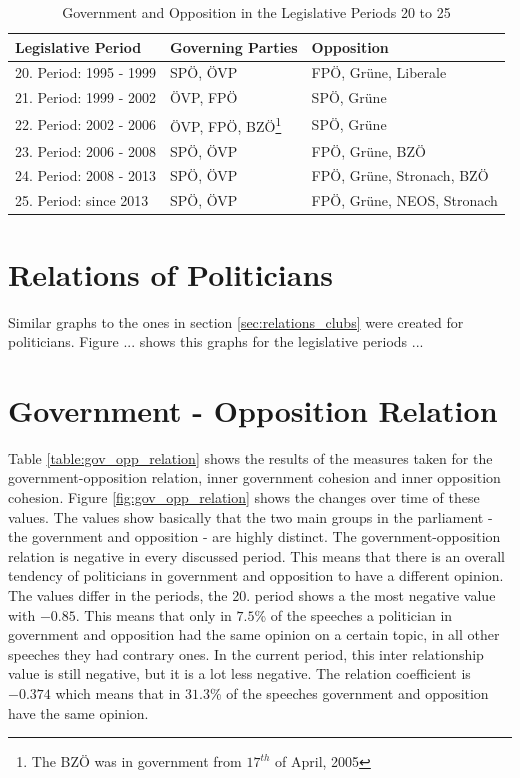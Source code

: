\begin{table}[h]

\centering
\bgroup
\def\arraystretch{1.2}
\begin{tabular}{| p{4cm} | p{3cm} | l |}
\hline
  Legislative Period & Governing Parties & Opposition  \\
\hline
\hline
  20. Period: 1995 - 1999 & SPÖ, ÖVP & FPÖ, Grüne, Liberale \\
\hline
  21. Period: 1999 - 2002 & ÖVP, FPÖ & SPÖ, Grüne \\
\hline
  22. Period: 2002 - 2006 & ÖVP, FPÖ, BZÖ\footnote{The BZÖ was in government from $17^{th}$ of April, 2005} & SPÖ, Grüne \\
\hline
  23. Period: 2006 - 2008 & SPÖ, ÖVP & FPÖ, Grüne, BZÖ \\
\hline
  24. Period: 2008 - 2013 & SPÖ, ÖVP & FPÖ, Grüne, Stronach, BZÖ \\
\hline
  25. Period: since 2013 & SPÖ, ÖVP & FPÖ, Grüne, NEOS, Stronach \\
\hline

\end{tabular}
\egroup
\caption{Government and Opposition in the Legislative Periods 20 to 25}
\label{table:gov_opp_parties}
\end{table}


\section{Relations of Politicians}
\label{sec:relations_pol}
Similar graphs to the ones in section \ref{sec:relations_clubs} were created for politicians. Figure ... shows this graphs for the legislative periods ... 

\section{Government - Opposition Relation}
\label{sec:gov_opp_relation}
Table \ref{table:gov_opp_relation} shows the results of the measures taken for the government-opposition relation, inner government cohesion and inner opposition cohesion. Figure \ref{fig:gov_opp_relation} shows the changes over time of these values. The values show basically that the two main groups in the parliament - the government and opposition - are highly distinct. The government-opposition relation is negative in every discussed period. This means that there is an overall tendency of politicians in government and opposition to have a different opinion. The values differ in the periods, the 20. period shows a the most negative value with $-0.85$. This means that only in $7.5$\% of the speeches a politician in government and opposition had the same opinion on a certain topic, in all other speeches they had contrary ones. In the current period, this inter relationship value is still negative, but it is a lot less negative. The relation coefficient is $-0.374$ which means that in $31.3$\% of the speeches government and opposition have the same opinion.



